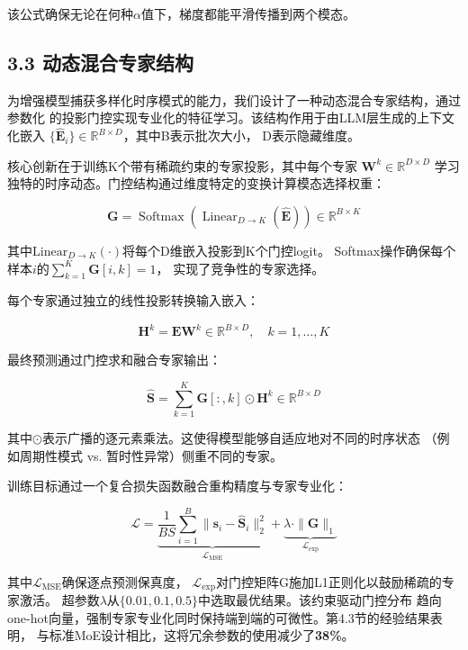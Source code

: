 \documentclass[
  10
]{article}
\begin{document}
该公式确保无论在何种\(\alpha\)值下，梯度都能平滑传播到两个模态。

\subsection{3.3 动态混合专家结构}\label{dynamic-mixture-of-experts-structure}

为增强模型捕获多样化时序模式的能力，我们设计了一种动态混合专家结构，通过参数化
的投影门控实现专业化的特征学习。该结构作用于由LLM层生成的上下文化嵌入
\(\{\hat{\mathbf{E}}_{i}\} \in \mathbb{R}^{B \times D}\)，其中B表示批次大小，
D表示隐藏维度。

核心创新在于训练K个带有稀疏约束的专家投影，其中每个专家
\(\mathbf{W}^{k} \in \mathbb{R}^{D \times D}\)
学习独特的时序动态。门控结构通过维度特定的变换计算模态选择权重：

\[
\mathbf{G} = \operatorname{Softmax}\left(\operatorname{Linear}_{D \to K}(\hat{\mathbf{E}})\right) \in \mathbb{R}^{B \times K}\tag{9}
\]

其中\(\mathrm{Linear}_{D \to K}(\cdot)\)将每个D维嵌入投影到K个门控logit。
Softmax操作确保每个样本\(i\)的\(\sum_{k=1}^{K}\mathbf{G}[i, k] = 1\)，
实现了竞争性的专家选择。

每个专家通过独立的线性投影转换输入嵌入：

\[
\mathbf{H}^{k} = \hat{\mathbf{E}}\mathbf{W}^{k} \in \mathbb{R}^{B \times D}, \quad k = 1, \dots, K\tag{10}
\]

最终预测通过门控求和融合专家输出：

\[
\hat{\mathbf{S}} = \sum_{k=1}^{K} \mathbf{G}[:, k] \odot \mathbf{H}^{k} \in \mathbb{R}^{B \times D}\tag{11}
\]

其中\(\odot\)表示广播的逐元素乘法。这使得模型能够自适应地对不同的时序状态
（例如周期性模式 vs. 暂时性异常）侧重不同的专家。

训练目标通过一个复合损失函数融合重构精度与专家专业化：

\[
\mathcal{L} = \underbrace{\frac{1}{B S} \sum_{i=1}^{B} \|\mathbf{s}_{i} - \hat{\mathbf{S}}_{i}\|_{2}^{2}}_{\mathcal{L}_{\mathrm{MSE}}} + \underbrace{\lambda \cdot \|\mathbf{G}\|_{1}}_{\mathcal{L}_{\mathrm{exp}}}\tag{12}
\]

其中\(\mathcal{L}_{\mathrm{MSE}}\)确保逐点预测保真度，
\(\mathcal{L}_{\mathrm{exp}}\)对门控矩阵G施加L1正则化以鼓励稀疏的专家激活。
超参数\(\lambda\)从\(\{0.01, 0.1, 0.5\}\)中选取最优结果。该约束驱动门控分布
趋向one-hot向量，强制专家专业化同时保持端到端的可微性。第4.3节的经验结果表明，
与标准MoE设计相比，这将冗余参数的使用减少了\textbf{38\%}。
\end{document}
